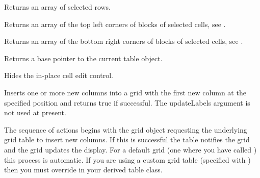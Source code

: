 Returns an array of selected rows.

\label{wxgridgetselectionblocktopleft}


Returns an array of the top left corners of blocks of selected cells, 
see .

\label{wxgridgetselectionblockbottomright}


Returns an array of the bottom right corners of blocks of selected cells,
see .

\label{wxgridgettable}


Returns a base pointer to the current table object.

\label{wxgridhidecelleditcontrol}


Hides the in-place cell edit control.

\label{wxgridinsertcols}


Inserts one or more new columns into a grid with the first new column at the
specified position and returns true if successful. The updateLabels argument is not
used at present. 

The sequence of actions begins with the grid object requesting the underlying grid
table to insert new columns. If this is successful the table notifies the grid and the
grid updates the display. For a default grid (one where you have called 
) this process is automatic. If you are
using a custom grid table (specified with ) 
then you must override 
 in your derived
table class.

\label{wxgridinsertrows}

